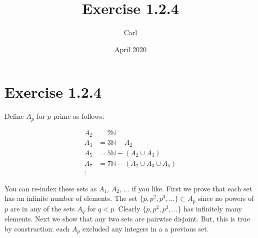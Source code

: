 \documentclass{article}
\title{Exercise 1.2.4}
\author{Carl}
\date{April 2020}
\begin{document}
\maketitle

\section{Exercise 1.2.4}
Define $A_p$ for $p$ prime as follows:

\begin{align*}
    A_2&=2\mathbb{N}\\
    A_3&=3\mathbb{N}-A_2\\
    A_5&=5\mathbb{N}-(A_2 \cup A_3)\\
    A_7&=7\mathbb{N}-(A_2 \cup A_3 \cup A_5)\\
    \vdots
\end{align*}

You can re-index these sets as $A_1$, $A_2$, $\dots$ if you like.  First we prove that each set has an infinite number of elements. The set $\{p, p^2, p^3, \dots\} \subset A_p$ since no powers of $p$ are in any of the sets $A_q$ for $q < p$.  Clearly $\{p, p^2, p^3, \dots\}$ has infinitely many elements. Next we show that any two sets are pairwise disjoint.  But, this is true by construction: each $A_p$ excluded any integers in a a previous set.
\end{document}
